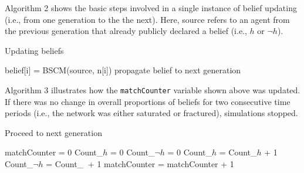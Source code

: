 \documentclass[doc,floatsintext]{apa6}
\begin{document}
Algorithm 2 shows the basic steps involved in a single instance of belief updating (i.e., from one generation to the the next). Here, source refers to an agent from the previous generation that already publicly declared a belief (i.e., \(h\) or \(\neg h\)).

\begin{algorithm}[H]
\caption{Updating beliefs}\label{update}
\begin{algorithmic}[1]
             \State belief[i] = BSCM(source, n[i])
               \State propagate belief to next generation
              \EndIf
             \EndIf
        \EndFor
    \EndIf
  \EndProcedure
\end{algorithmic}
\end{algorithm}

Algorithm 3 illustrates how the {\tt matchCounter} variable shown above was updated. If there was no change in overall proportions of beliefs for two consecutive time periods (i.e., the network was either saturated or fractured), simulations stopped.

\begin{algorithm}[H]
\caption{Proceed to next generation}\label{proceed}
\begin{algorithmic}[1]
    \State matchCounter = 0 
    \State Count_{\(h\)} = 0
    \State Count_{\(\neg h\)} = 0
            \State Count_{\(h\)} = Count_{\(h\)} + 1
        \EndIf
            \State Count_{\(\neg h\)} = Count_{\(\ \)} + 1
        \EndIf
    \EndFor
        \State matchCounter = matchCounter + 1
    \EndIf
  \EndProcedure
\end{algorithmic}
\end{algorithm}

\newpage



\end{document}
